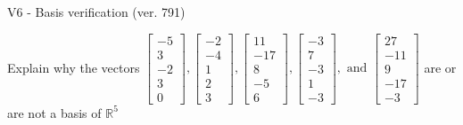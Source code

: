 \begin{exercise}
  \begin{exerciseTitle}V6 - Basis verification (ver. 791)\end{exerciseTitle}
  \begin{exerciseStatement}
    Explain why the vectors \(\left[\begin{array}{r}
-5 \\
3 \\
-2 \\
3 \\
0
\end{array}\right] , \left[\begin{array}{r}
-2 \\
-4 \\
1 \\
2 \\
3
\end{array}\right] , \left[\begin{array}{r}
11 \\
-17 \\
8 \\
-5 \\
6
\end{array}\right] , \left[\begin{array}{r}
-3 \\
7 \\
-3 \\
1 \\
-3
\end{array}\right] , \text{ and } \left[\begin{array}{r}
27 \\
-11 \\
9 \\
-17 \\
-3
\end{array}\right]\) are or are not a basis of \(\mathbb{R}^5\)	



\end{exerciseStatement}
\end{exercise}
